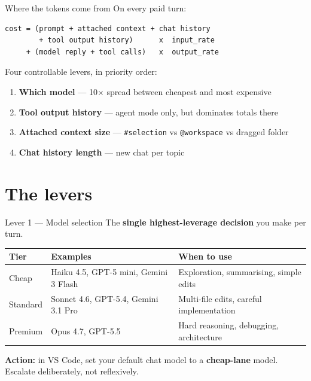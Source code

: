 \documentclass[11pt,aspectratio=169]{beamer}
\newcommand{\hl}[1]{\textbf{\textcolor{accentblue}{#1}}}
\begin{document}
\begin{frame}[fragile]{Where the tokens come from}
  On every paid turn:
\begin{lstlisting}
cost = (prompt + attached context + chat history
        + tool output history)      x  input_rate
     + (model reply + tool calls)   x  output_rate
\end{lstlisting}
  \medskip
  Four controllable levers, in priority order:
  \begin{enumerate}
    \item \hl{Which model} --- 10$\times$ spread between cheapest and most expensive
    \item \hl{Tool output history} --- agent mode only, but dominates totals there
    \item \hl{Attached context size} --- \texttt{\#selection} vs \texttt{@workspace} vs dragged folder
    \item \hl{Chat history length} --- new chat per topic
  \end{enumerate}
\end{frame}

\section{The levers}

\begin{frame}{Lever 1 --- Model selection}
  The \hl{single highest-leverage decision} you make per turn.

  \medskip
  \centering\small
  \begin{tabular}{lll}
    \toprule
    \textbf{Tier} & \textbf{Examples} & \textbf{When to use} \\
    \midrule
    Cheap    & Haiku 4.5, GPT-5 mini, Gemini 3 Flash & Exploration, summarising, simple edits \\
    Standard & Sonnet 4.6, GPT-5.4, Gemini 3.1 Pro   & Multi-file edits, careful implementation \\
    Premium  & Opus 4.7, GPT-5.5                     & Hard reasoning, debugging, architecture \\
    \bottomrule
  \end{tabular}

  \vfill
  \raggedright
  \textbf{Action:} in VS Code, set your default chat model to a \hl{cheap-lane} model. Escalate deliberately, not reflexively.
\end{frame}
\end{document}
